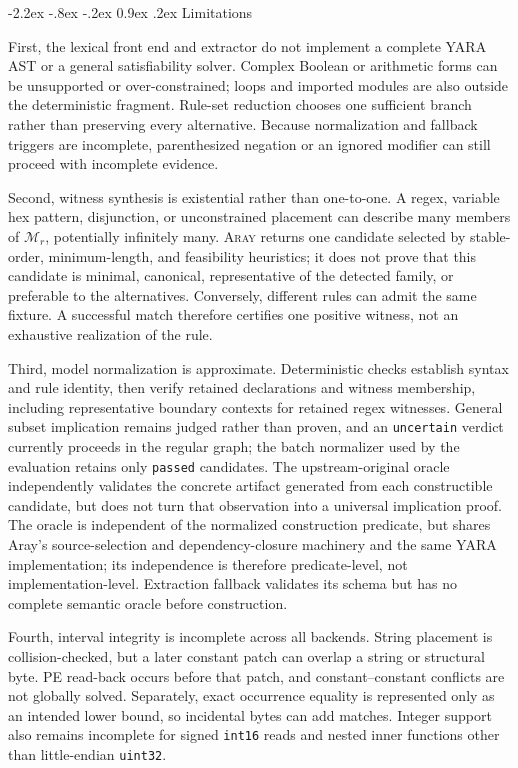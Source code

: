 \documentclass[11pt,twocolumn]{article}
\makeatletter
\newcommand{\tool}{\textsc{Aray}\xspace}
\newcommand{\code}[1]{\texttt{#1}}
\renewcommand\section{\@startsection{section}{1}{\z@}%
  {-2.2ex \@plus -.8ex \@minus -.2ex}%
  {0.9ex \@plus .2ex}%
  {\normalfont\large\bfseries}}
\makeatother
\begin{document}
\section{Limitations}

First, the lexical front end and extractor do not implement a complete YARA AST
or a general satisfiability solver. Complex Boolean or arithmetic forms can be
unsupported or over-constrained; loops and imported modules are also outside the
deterministic fragment. Rule-set reduction chooses one sufficient branch rather
than preserving every alternative. Because normalization and fallback triggers
are incomplete, parenthesized negation or an ignored modifier can still proceed
with incomplete evidence.

Second, witness synthesis is existential rather than one-to-one. A regex,
variable hex pattern, disjunction, or unconstrained placement can describe many
members of $\mathcal{M}_r$, potentially infinitely many. \tool returns one
candidate selected by stable-order, minimum-length, and feasibility heuristics;
it does not prove that this candidate is minimal, canonical, representative of
the detected family, or preferable to the alternatives. Conversely, different
rules can admit the same fixture. A successful match therefore certifies one
positive witness, not an exhaustive realization of the rule.

Third, model normalization is approximate. Deterministic checks establish
syntax and rule identity, then verify retained declarations and witness
membership, including representative boundary contexts for retained regex
witnesses. General subset implication remains judged rather than proven, and an
\code{uncertain} verdict currently proceeds in the regular graph; the batch
normalizer used by the evaluation retains only \code{passed} candidates. The
upstream-original oracle independently validates the concrete artifact generated
from each constructible candidate, but does not turn that observation into a
universal implication proof. The oracle is independent of the normalized
construction predicate, but shares Aray's source-selection and dependency-closure
machinery and the same YARA implementation; its independence is therefore
predicate-level, not implementation-level. Extraction fallback validates its
schema but has no complete semantic oracle before construction.

Fourth, interval integrity is incomplete across all backends. String placement is
collision-checked, but a later constant patch can overlap a string or structural
byte. PE read-back occurs before that patch, and constant--constant conflicts are
not globally solved. Separately, exact occurrence equality is represented only
as an intended lower bound, so incidental bytes can add matches. Integer support
also remains incomplete for signed \code{int16} reads and nested inner functions
other than little-endian \code{uint32}.
\end{document}

